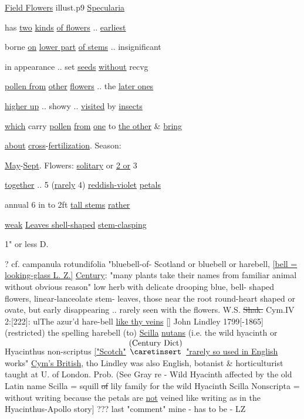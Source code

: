 \documentclass[a4paper]{article}
\begin{document}
\begin{minipage}[t]{10cm}
\vspace{3cm}
\ul{Field Flowers}
illust.p9 \ul{Specularia}\par
{}%
\hspace{3cm}\par 
\setul{}{2pt}
has \ul{two} \ul{kinds} \ul{of flowers} .. \ul{earliest}\par
borne \ul{on} \ul{lower part} \ul{of stems} .. insignificant\par
in appearance .. set \ul{seeds} \ul{without} recvg\par
\ul{pollen from} \ul{other} \ul{flowers} .. the \ul{later ones}\par
\ul{higher up} .. showy .. \ul{visited} by \ul{insects}\par
\ul{which} carry \ul{pollen} \ul{from} \ul{one} to \ul{the other} \& \ul{bring}\par
\ul{about} \ul{cross}-\ul{fertilization}. Season:\par
\ul{May}-\ul{Sept}. Flowers: \ul{solitary} or \ul{2 or} 3\par
\ul{together} .. 5 (\ul{rarely} 4) \ul{reddish-violet} \ul{petals}\par
annual 6 in to 2ft \ul{tall stems} \ul{rather}\par
\ul{weak} \ul{Leaves shell-shaped} \ul{stem}\ul{-clasping}\par
1" or less D.\par 
\color{red}
? cf. campanula rotundifolia "bluebell-of-
Scotland or bluebell or harebell,
\ul{[bell = looking-glass L. Z.]} 
\setul{}{1pt}
\ul{Century}:
"many plants take their names from
familiar animal %
without obvious reason"
low herb with delicate drooping blue, bell-
shaped flowers, linear-lanceolate stem-
leaves, those near the root round-heart
shaped or ovate, but early disappearing
.. rarely seen with the flowers.
W.S. \sout{Shak.} Cym.IV 2:[222]: ul{The azur'd hare-bell}
\ul{like thy veins} [] John Lindley 1799[-1865]
(restricted) the spelling harebell
(to) \ul{Scilla} \ul{nutans} (i.e. the wild
hyacinth or Hyacinthus non-scriptus
\ul{
    ["Scotch"} 
\color{blue}
$\stackrel{\hbox{(Century Dict)}}{\hbox{$\caretinsert$}}$
\color{red}
\ul{"rarely so used in English}
works" \ul{Cym's British}, tho Lindley 
was also English, botanist \& horticulturist
taught at U. of London. Prob. (See
Gray re - Wild Hyacinth affected
by the old Latin name Scilla = squill
\sout{of} lily family for the wild Hyacinth
Scilla Nonscripta = without writing
because the petals are \ul{not} veined like
writing as in the Hyacinthus-Apollo story]
\color{blue}
??? last "comment" mine
- has to be - LZ
\end{minipage}
\end{document}

